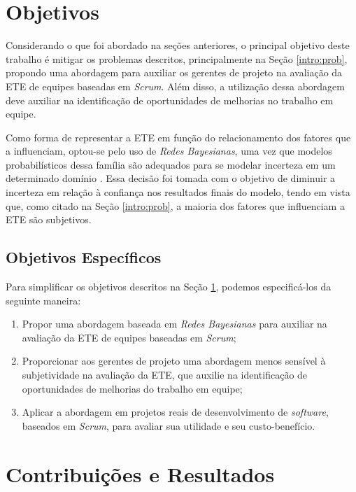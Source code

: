 \section{Objetivos}
\label{intro:obj}

Considerando o que foi abordado na seções anteriores, o principal objetivo deste trabalho é mitigar os problemas descritos, principalmente na Seção \ref{intro:prob}, propondo uma abordagem para auxiliar os gerentes de projeto na avaliação da ETE de equipes baseadas em \textit{Scrum}. Além disso, a utilização dessa abordagem deve auxiliar na identificação de oportunidades de melhorias no trabalho em equipe.

Como forma de representar a ETE em função do relacionamento dos fatores que a influenciam, optou-se pelo uso de \textit{Redes Bayesianas}, uma vez que modelos probabilísticos dessa família são adequados para se modelar incerteza em um determinado domínio \cite{bengal}. Essa decisão foi tomada com o objetivo de diminuir a incerteza em relação à confiança nos resultados finais do modelo, tendo em vista que, como citado na Seção \ref{intro:prob}, a maioria dos fatores que influenciam a ETE são subjetivos.

\subsection{Objetivos Específicos}
\label{intro:obj:esp}

Para simplificar os objetivos descritos na Seção \ref{intro:obj}, podemos especificá-los da seguinte maneira:

\begin{enumerate}
  \item Propor uma abordagem baseada em \textit{Redes Bayesianas} para auxiliar na avaliação da ETE de equipes baseadas em \textit{Scrum};
  \item Proporcionar aos gerentes de projeto uma abordagem menos sensível à subjetividade na avaliação da ETE, que auxilie na identificação de oportunidades de melhorias do trabalho em equipe;
  \item Aplicar a abordagem em projetos reais de desenvolvimento de \textit{software}, baseados em \textit{Scrum}, para avaliar sua utilidade e seu custo-benefício.
\end{enumerate}

\section{Contribuições e Resultados}
\label{intro:result}

